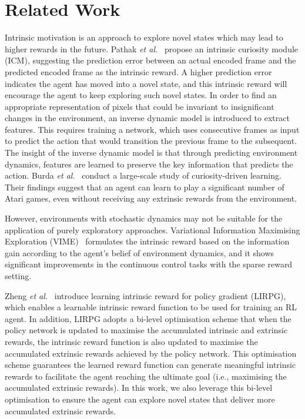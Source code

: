 \section{Related Work}
Intrinsic motivation is an approach to explore novel states which may lead to higher rewards in the future. Pathak \textit{et al.}~\cite{pathak2017curiosity} propose an intrinsic curiosity module (ICM), suggesting the prediction error between an actual encoded frame and the predicted encoded frame as the intrinsic reward. A higher prediction error indicates the agent has moved into a novel state, and this intrinsic reward will encourage the agent to keep exploring such novel states. In order to find an appropriate representation of pixels that could be invariant to insignificant changes in the environment, an inverse dynamic model is introduced to extract features. This requires training a network, which uses consecutive frames as input to predict the action that would transition the previous frame to the subsequent. The insight of the inverse dynamic model is that through predicting environment dynamics, features are learned to preserve the key information that predicts the action. Burda \textit{et al.}~\cite{burda2018largescale} conduct a large-scale study of curiosity-driven learning. Their findings suggest that an agent can learn to play a significant number of Atari games, even without receiving any extrinsic rewards from the environment. 

However, environments with stochastic dynamics may not be suitable for the application of purely exploratory approaches. Variational Information Maximising Exploration (VIME)~\cite{NIPS2016_abd81528} formulates the intrinsic reward based on the information gain according to the agent’s belief of environment dynamics, and it shows significant improvements in the continuous control tasks with the sparse reward setting. 

Zheng \textit{et al.}~\cite{zheng2018learning} introduce learning intrinsic reward for policy gradient (LIRPG), which enables a learnable intrinsic reward function to be used for training an RL agent. In addition, LIRPG adopts a bi-level optimisation scheme that when the policy network is updated to maximise the accumulated intrinsic and extrinsic rewards, the intrinsic reward function is also updated to maximise the accumulated extrinsic rewards achieved by the policy network. This optimisation scheme guarantees the learned reward function can generate meaningful intrinsic rewards to facilitate the agent reaching the ultimate goal (i.e., maximising the accumulated extrinsic rewards). In this work, we also leverage this bi-level optimisation to ensure the agent can explore novel states that deliver more accumulated extrinsic rewards.

